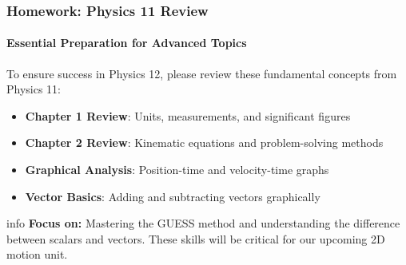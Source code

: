 \documentclass{beamer}
\begin{document}
\begin{frame}
\frametitle{Homework: Physics 11 Review}
\framesubtitle{Essential Preparation for Advanced Topics}

To ensure success in Physics 12, please review these fundamental concepts from Physics 11:

\begin{itemize}
    \item \textbf{Chapter 1 Review}: Units, measurements, and significant figures
    \item \textbf{Chapter 2 Review}: Kinematic equations and problem-solving methods
    \item \textbf{Graphical Analysis}: Position-time and velocity-time graphs
    \item \textbf{Vector Basics}: Adding and subtracting vectors graphically
\end{itemize}

\begin{beamercolorbox}[rounded=true,shadow=true]{info}
\centering
\textbf{Focus on:} Mastering the GUESS method and understanding the difference between scalars and vectors. These skills will be critical for our upcoming 2D motion unit.
\end{beamercolorbox}

\end{frame}
\end{document}
